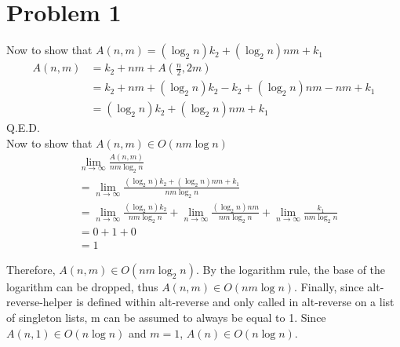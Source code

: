 \documentclass[12pt,letterpaper]{article}
\newenvironment{answer}[1]{
  \section*{Problem #1}
}{\newpage}
\begin{document}
\begin{answer}{1}
  Now to show that $A(n,m) = (\log_2n)k_2 + (\log_2n)nm + k_1$
  \begin{align*}
A(n,m) &= k_2 + nm + A(\frac{n}{2}, 2m) \\
&= k_2 + nm + (\log_2n)k_2-k_2 + (\log_2n)nm - nm + k_1  \\
&= (\log_2n)k_2 + (\log_2n)nm + k_1
\end{align*}
Q.E.D.\\

Now to show that $A(n,m) \in O(nm\log n)$\\



\begin{align*}
&\lim_{n \to \infty} \frac{A(n,m)}
{nm \log_2n}\\
&=\lim_{n \to \infty} \frac{(\log_2n)k_2 + (\log_2n)nm + k_1}
{nm \log_2n}\\
&=\lim_{n \to \infty} \frac{(\log_2n)k_2}
{nm \log_2n} + \lim_{n \to \infty} \frac{(\log_2n)nm }
{nm \log_2n} + \lim_{n \to \infty} \frac{k_1}{nm \log_2n}\\
&= 0 + 1 + 0\\
&= 1
\end{align*}

Therefore, $A(n,m) \in O(nm\log_2n)$. By the logarithm rule, the base of the logarithm can be dropped, thus $A(n,m) \in O(nm\log n)$. Finally, since alt-reverse-helper is defined within alt-reverse and only called in alt-reverse on a list of singleton lists, m can be assumed to always be equal to 1. Since $A(n,1) \in O(n\log n)$ and $m=1$, $A(n) \in O(n\log n)$.


\end{answer}
\end{document}

